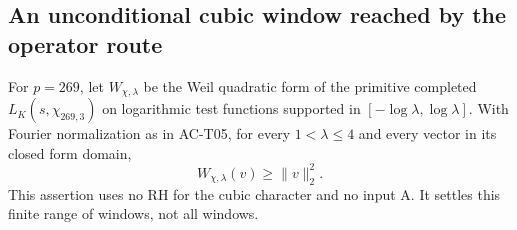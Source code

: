 \subsection{An unconditional cubic window reached by the operator route}

\begin{proposition}[AC-K09: strict cubic positivity through $\lambda=4$]
\label{AC-K09}
For $p=269$, let $W_{\chi,\lambda}$ be the Weil quadratic form
of the primitive completed $L_K(s,\chi_{269,3})$ on logarithmic
test functions supported in $[-\log\lambda,\log\lambda]$.
With Fourier normalization as in AC-T05, for every
$1<\lambda\le4$ and every vector in its closed form domain,
\[
                     W_{\chi,\lambda}(v)\ge\|v\|_2^2.
\]
This assertion uses no RH for the cubic character and no input A.
It settles this finite range of windows, not all windows.
\end{proposition}
